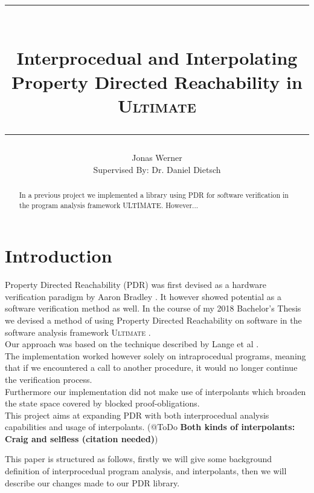 \documentclass{article}
\begin{document}
	\newcommand{\HorizontalLine}{\rule{\linewidth}{0.3mm}}
	
	\title{ \HorizontalLine \\ \textbf{Interprocedual and Interpolating \\ Property Directed Reachability in \textsc{Ultimate}} \HorizontalLine}
	

	
	\author{Jonas Werner \\ Supervised By: Dr. Daniel Dietsch}


	
	\date{}
	
	\maketitle
	
	\begin{abstract}
	In a previous project we implemented a library using PDR for software verification in the program analysis framework ULTIMATE. However...
	\end{abstract}
	
	
	\section{Introduction}
	
	Property Directed Reachability (PDR) was first devised as a hardware verification paradigm by Aaron Bradley \cite{DBLP:conf/vmcai/Bradley11}. It however showed potential as a software verification method as well.
	In the course of my 2018 Bachelor's Thesis we devised a method of using Property Directed Reachability on software in the software analysis framework \textsc{Ultimate} \cite{Zitat02}. \\
	Our approach was based on the technique described by Lange et al \cite{DBLP:conf/date/WelpK13}. \\ The implementation worked however solely on intraprocedual programs, meaning that if we encountered a call to another procedure, it would no longer continue the verification process. \\
	Furthermore our implementation did not make use of interpolants which broaden the state space covered by blocked proof-obligations. \\
	This project aims at expanding PDR with both interprocedual analysis capabilities and usage of interpolants. (@ToDo \textbf{Both kinds of interpolants: Craig and selfless (citation needed)}) \par
    This paper is structured as follows, firstly we will give some background definition of interprocedual program analysis, and interpolants, then we will describe our changes made to our PDR library.
	
\end{document}
